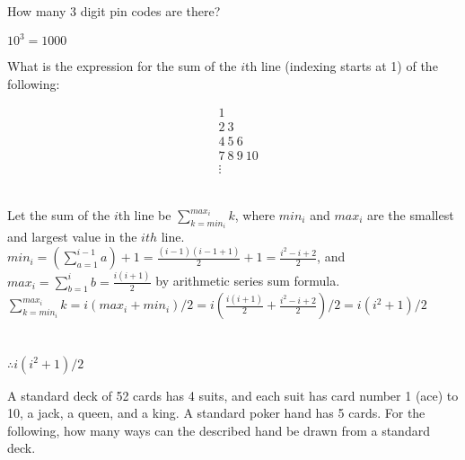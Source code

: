\documentclass[solutionorbox,answers]{exam}
\begin{document}
\begin{questions}
\question
How many 3 digit pin codes are there?

\begin{solutionbox}{0.5in}
  $10^3 = 1000$
\end{solutionbox}

\question
What is the expression for the sum of the $i$th line (indexing starts at 1) of the following: \\
\begin{minipage}{0.1\textwidth}
\begin{align*}
 & 1        \\
 & 2\ 3      \\
 & 4\ 5\ 6    \\
 & 7\ 8\ 9\ 10 \\
 & \vdots
\end{align*}
\end{minipage}
\begin{minipage}{0.89\linewidth}
\begin{solutionbox}{2in} \\
    Let the sum of the $i$th line be $\sum_{k=min_i}^{max_i}k$, where $min_i$ and $max_i$ are the smallest and largest value in the $ith$ line.\\
    $min_i = (\sum_{a=1}^{i-1}a)+1 = \frac{(i-1)(i-1+1)}{2}+1 = \frac{i^2-i+2}{2}$, and\\
    $max_i = \sum_{b=1}^{i}b = \frac{i(i+1)}{2}$ by arithmetic series sum formula.\\
    $\sum_{k=min_i}^{max_i}k = i(max_i+min_i)/2 = i(\frac{i(i+1)}{2}+\frac{i^2-i+2}{2})/2 = i(i^2+1)/2$\\
    \\
    \\
    $\therefore i(i^2+1)/2$
\end{solutionbox}
\end{minipage}

\question
A standard deck of 52 cards has 4 suits, and each suit has card number 1 (ace) to 10, a jack, a queen, and a king. A standard poker hand has 5 cards. For the following, how many ways can the described hand be drawn from a standard deck.

\end{questions}
\end{document}
